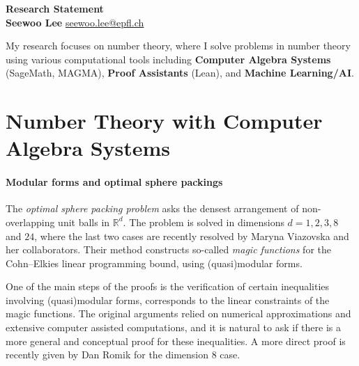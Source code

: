 \documentclass[letterpaper, 10pt]{article}
\begin{document}
\begin{center}
\Large\textbf{Research Statement} \\
\large\textbf{Seewoo Lee} \href{mailto:seewoo.lee@epfl.ch}{seewoo.lee@epfl.ch} \\
\end{center}





My research focuses on number theory, where I solve problems in number theory using various computational tools including \textbf{Computer Algebra Systems} (SageMath, MAGMA), \textbf{Proof Assistants} (Lean), and \textbf{Machine Learning/AI}.





\section{Number Theory with Computer Algebra Systems}


\paragraph{Modular forms and optimal sphere packings}
\label{subsec:algproof}

The \emph{optimal sphere packing problem} asks the densest arrangement of non-overlapping unit balls in $\mathbb{R}^{d}$.
The problem is solved in dimensions $d = 1, 2, 3, 8$ and $24$, where the last two cases are recently resolved by Maryna Viazovska and her collaborators.
Their method constructs so-called \emph{magic functions} for the Cohn--Elkies linear programming bound, using (quasi)modular forms.


One of the main steps of the proofs is the verification of certain inequalities involving (quasi)modular forms, corresponds to the linear constraints of the magic functions.
The original arguments relied on numerical approximations and extensive computer assisted computations, and it is natural to ask if there is a more general and conceptual proof for these inequalities.
A more direct proof is recently given by Dan Romik for the dimension 8 case.
\end{document}
